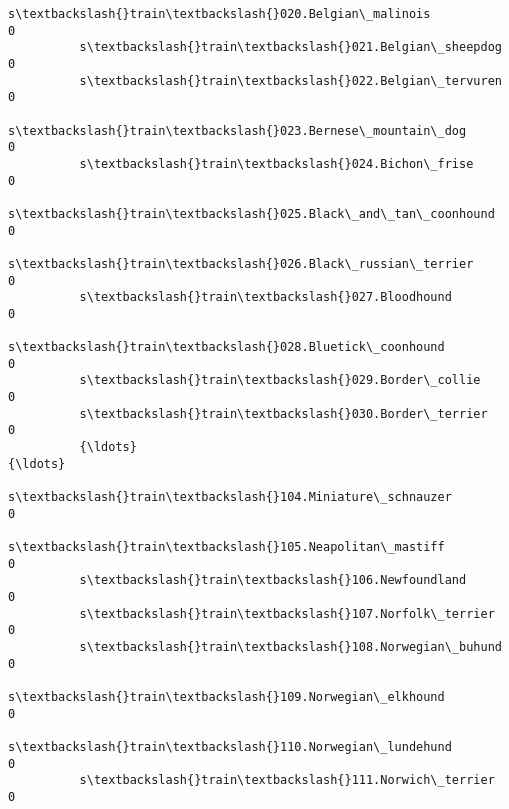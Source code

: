 \documentclass[11pt]{article}
\begin{document}
\begin{Verbatim}[commandchars=\\\{\}]
          s\textbackslash{}train\textbackslash{}020.Belgian\_malinois                                                             0   
          s\textbackslash{}train\textbackslash{}021.Belgian\_sheepdog                                                             0   
          s\textbackslash{}train\textbackslash{}022.Belgian\_tervuren                                                             0   
          s\textbackslash{}train\textbackslash{}023.Bernese\_mountain\_dog                                                         0   
          s\textbackslash{}train\textbackslash{}024.Bichon\_frise                                                                 0   
          s\textbackslash{}train\textbackslash{}025.Black\_and\_tan\_coonhound                                                      0   
          s\textbackslash{}train\textbackslash{}026.Black\_russian\_terrier                                                        0   
          s\textbackslash{}train\textbackslash{}027.Bloodhound                                                                   0   
          s\textbackslash{}train\textbackslash{}028.Bluetick\_coonhound                                                           0   
          s\textbackslash{}train\textbackslash{}029.Border\_collie                                                                0   
          s\textbackslash{}train\textbackslash{}030.Border\_terrier                                                               0   
          {\ldots}                                                                                    {\ldots}   
          s\textbackslash{}train\textbackslash{}104.Miniature\_schnauzer                                                          0   
          s\textbackslash{}train\textbackslash{}105.Neapolitan\_mastiff                                                           0   
          s\textbackslash{}train\textbackslash{}106.Newfoundland                                                                 0   
          s\textbackslash{}train\textbackslash{}107.Norfolk\_terrier                                                              0   
          s\textbackslash{}train\textbackslash{}108.Norwegian\_buhund                                                             0   
          s\textbackslash{}train\textbackslash{}109.Norwegian\_elkhound                                                           0   
          s\textbackslash{}train\textbackslash{}110.Norwegian\_lundehund                                                          0   
          s\textbackslash{}train\textbackslash{}111.Norwich\_terrier                                                              0   

\end{Verbatim}
\end{document}
